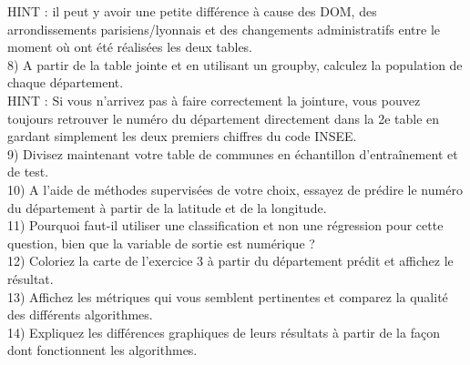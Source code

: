 \documentclass[a4paper]{article}
\begin{document}
HINT : il peut y avoir une petite différence à cause des DOM, des arrondissements parisiens/lyonnais et des changements administratifs entre le moment où ont été réalisées les deux tables.\\

8) A partir de la table jointe et en utilisant un groupby, calculez la population de chaque département.\\

HINT : Si vous n'arrivez pas à faire correctement la jointure, vous pouvez toujours retrouver le numéro du département directement dans la 2e table en gardant simplement les deux premiers chiffres du code INSEE.\\

9) Divisez maintenant votre table de communes en échantillon d'entraînement et de test. \\

10) A l'aide de méthodes supervisées de votre choix, essayez de prédire le numéro du département à partir de la latitude et de la longitude.\\

11) Pourquoi faut-il utiliser une classification et non une régression pour cette question, bien que la variable de sortie est numérique ?\\

12) Coloriez la carte de l'exercice 3 à partir du département prédit et affichez le résultat.\\

13) Affichez les métriques qui vous semblent pertinentes et comparez la qualité des différents algorithmes.\\

14) Expliquez les différences graphiques de leurs résultats à partir de la façon dont fonctionnent les algorithmes.
\end{document}
